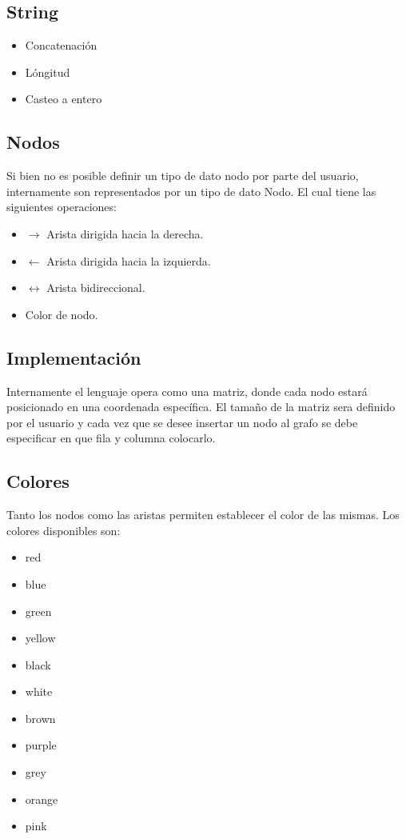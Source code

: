 \documentclass{article}
\begin{document}
	\subsection{String}
	\begin{itemize}
		\item Concatenación
	    \item Lóngitud
	    \item Casteo a entero
	\end{itemize}
    \subsection{Nodos}
    Si bien no es posible definir un tipo de dato nodo por parte del usuario, 
    internamente son representados por un tipo de dato Nodo. El cual tiene las siguientes operaciones:
    \begin{itemize}
       \item{$\rightarrow$ Arista dirigida hacia la derecha.}
       \item{$\leftarrow$ Arista dirigida hacia la izquierda.}
       \item{$\leftrightarrow$ Arista bidireccional.}
       \item Color de nodo.
    \end{itemize}
    \subsection{Implementación}
    Internamente el lenguaje opera como una matriz, donde cada nodo estará posicionado en una coordenada específica.
    El tamaño de la matriz sera definido por el usuario y cada vez que se desee insertar un nodo al grafo se debe
    especificar en que fila y columna colocarlo.
    \subsection{Colores}
    Tanto los nodos como las aristas permiten establecer el color de las mismas. Los colores disponibles son:
    \begin{itemize}
        \color{red}
        \item red
        \color{blue}
        \item blue
        \color{green}
        \item green
        \color{yellow}
        \item yellow
        \color{black}
        \item black
        \color{black}
        \item white
        \color{brown}
        \item brown
        \color{purple}
        \item purple
        \color{gray}
        \item grey
        \color{orange}
        \item orange
        \color{pink}
        \item pink
    \end{itemize}
\end{document}
